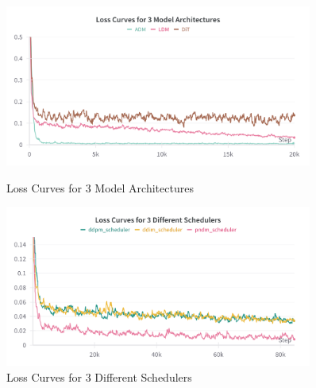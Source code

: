 \documentclass[conference]{IEEEtran}
\begin{document}
\begin{figure}[H]
    \begin{minipage}{0.50\textwidth}
        \includegraphics[width=0.9\textwidth]{figures/loss_curve3.png}
    \caption{Loss Curves for 3 Model Architectures} \label{fig:loss_architecture}
    \end{minipage}
    \begin{minipage}{0.50\textwidth}
    \centering
        \includegraphics[width=0.9\textwidth]{figures/loss_curve2.png}
    \caption{Loss Curves for 3 Different Schedulers} \label{fig:loss_scheduler}
    \end{minipage}
\end{figure} \FloatBarrier
\end{document}

